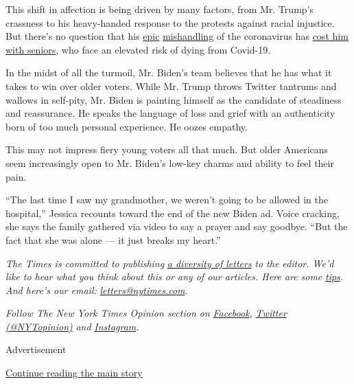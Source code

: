 This shift in affection is being driven by many factors, from Mr.
Trump's crassness to his heavy-handed response to the protests against
racial injustice. But there's no question that his
\href{https://www.nytimes.com/2020/07/18/us/politics/trump-coronavirus-response-failure-leadership.html}{epic}
\href{https://www.nytimes.com/2020/04/11/us/politics/coronavirus-trump-response.html}{mishandling}
of the coronavirus has
\href{https://www.nytimes.com/2020/05/09/us/politics/trump-older-voters-2020.html?action=click\&module=RelatedLinks\&pgtype=Article}{cost
him with seniors}, who face an elevated risk of dying from Covid-19.

In the midst of all the turmoil, Mr. Biden's team believes that he has
what it takes to win over older voters. While Mr. Trump throws Twitter
tantrums and wallows in self-pity, Mr. Biden is painting himself as the
candidate of steadiness and reassurance. He speaks the language of loss
and grief with an authenticity born of too much personal experience. He
oozes empathy.

This may not impress fiery young voters all that much. But older
Americans seem increasingly open to Mr. Biden's low-key charms and
ability to feel their pain.

``The last time I saw my grandmother, we weren't going to be allowed in
the hospital,'' Jessica recounts toward the end of the new Biden ad.
Voice cracking, she says the family gathered via video to say a prayer
and say goodbye. ``But the fact that she was alone --- it just breaks my
heart.''

\emph{The Times is committed to publishing}
\href{https://www.nytimes.com/2019/01/31/opinion/letters/letters-to-editor-new-york-times-women.html}{\emph{a
diversity of letters}} \emph{to the editor. We'd like to hear what you
think about this or any of our articles. Here are some}
\href{https://help.nytimes.com/hc/en-us/articles/115014925288-How-to-submit-a-letter-to-the-editor}{\emph{tips}}\emph{.
And here's our email:}
\href{mailto:letters@nytimes.com}{\emph{letters@nytimes.com}}\emph{.}

\emph{Follow The New York Times Opinion section on}
\href{https://www.facebook.com/nytopinion}{\emph{Facebook}}\emph{,}
\href{http://twitter.com/NYTOpinion}{\emph{Twitter (@NYTopinion)}}
\emph{and}
\href{https://www.instagram.com/nytopinion/}{\emph{Instagram}}\emph{.}

Advertisement

\protect\hyperlink{after-bottom}{Continue reading the main story}


